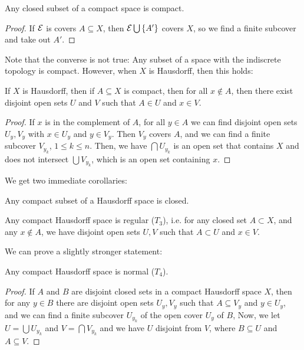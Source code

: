 \begin{proposition}
    Any closed subset of a compact space is compact.
\end{proposition}

\begin{proof}
    If $\mathcal E$ is covers $A \subseteq X$, then $\mathcal E \bigcup \qty{A'}$ covers $X$, so we find a finite subcover and take out $A'$.
\end{proof}

Note that the converse is not true: Any subset of a space with the indiscrete topology is compact. However, when $X$ is Hausdorff, then this holds:

\begin{proposition}
    If $X$ is Hausdorff, then if $A \subseteq X$ is compact, then for all $x \notin A$, then there exist disjoint open sets $U$ and $V$ such that $A \in U$ and $x \in V$.
\end{proposition}

\begin{proof}
    If $x$ is in the complement of $A$, for all $y \in A$ we can find disjoint open sets $U_y, V_y$ with $x\in U_y$ and $y \in V_y$. Then $V_y$ covers $A$, and we can find a finite subcover $V_{y_k}$, $1 \le k \le n$. Then, we have $\bigcap U_{y_k}$ is an open set that contains $X$ and does not intersect $\bigcup V_{y_k}$, which is an open set containing $x$.
\end{proof}

We get two immediate corollaries:

\begin{corollary}
    \label{prop:compsuboft2closed}
    Any compact subset of a Hausdorff space is closed.
\end{corollary}

\begin{corollary}
    Any compact Hausdorff space is regular ($T_3$), i.e. for any closed set $A \subset X$, and any $x \notin A$, we have disjoint open sets $U, V$ such that $A \subset U$ and $x \in V$.
\end{corollary}

We can prove a slightly stronger statement: 

\begin{corollary}
    Any compact Hausdorff space is normal ($T_4$).
\end{corollary}

\begin{proof}
    If $A$ and $B$ are disjoint closed sets in a compact Hausdorff space $X$, then for any $y \in B$ there are disjoint open sets $U_y, V_y$ such that $A \subseteq V_y$ and $y \in U_y$, and we can find a finite subcover $U_{y_k}$ of the open cover $U_y$ of $B$, Now, we let $U = \bigcup U_{y_k}$ and $V = \bigcap V_{y_k}$ and we have $U$ disjoint from $V$, where $B \subseteq U$ and $A \subseteq V$. 
\end{proof}


